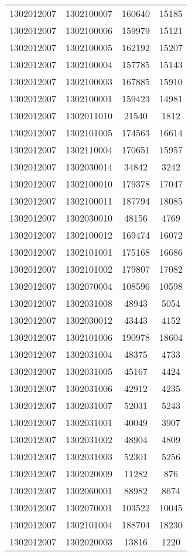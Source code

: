 \begin{longtable}{llcc}
1302012007 & 1302100007 & 160640 & 15185\\
1302012007 & 1302100006 & 159979 & 15121\\
1302012007 & 1302100005 & 162192 & 15207\\
1302012007 & 1302100004 & 157785 & 15143\\
1302012007 & 1302100003 & 167885 & 15910\\
1302012007 & 1302100001 & 159423 & 14981\\
1302012007 & 1302011010 & 21540 & 1812\\
1302012007 & 1302101005 & 174563 & 16614\\
1302012007 & 1302110004 & 170651 & 15957\\
1302012007 & 1302030014 & 34842 & 3242\\
1302012007 & 1302100010 & 179378 & 17047\\
1302012007 & 1302100011 & 187794 & 18085\\
1302012007 & 1302030010 & 48156 & 4769\\
1302012007 & 1302100012 & 169474 & 16072\\
1302012007 & 1302101001 & 175168 & 16686\\
1302012007 & 1302101002 & 179807 & 17082\\
1302012007 & 1302070004 & 108596 & 10598\\
1302012007 & 1302031008 & 48943 & 5054\\
1302012007 & 1302030012 & 43443 & 4152\\
1302012007 & 1302101006 & 190978 & 18604\\
1302012007 & 1302031004 & 48375 & 4733\\
1302012007 & 1302031005 & 45167 & 4424\\
1302012007 & 1302031006 & 42912 & 4235\\
1302012007 & 1302031007 & 52031 & 5243\\
1302012007 & 1302031001 & 40049 & 3907\\
1302012007 & 1302031002 & 48904 & 4809\\
1302012007 & 1302031003 & 52301 & 5256\\
1302012007 & 1302020009 & 11282 & 876\\
1302012007 & 1302060001 & 88982 & 8674\\
1302012007 & 1302070001 & 103522 & 10045\\
1302012007 & 1302101004 & 188704 & 18230\\
1302012007 & 1302020003 & 13816 & 1220\\

\end{longtable}
